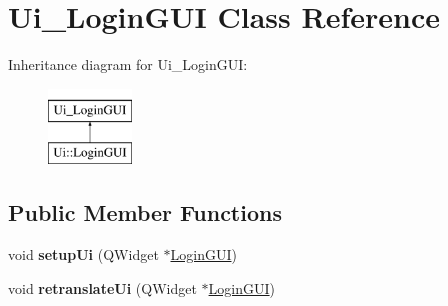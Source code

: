 \hypertarget{classUi__LoginGUI}{}\section{Ui\+\_\+\+Login\+G\+UI Class Reference}
\label{classUi__LoginGUI}
Inheritance diagram for Ui\+\_\+\+Login\+G\+UI\+:\begin{figure}[H]
\begin{center}
\leavevmode
\includegraphics[height=2.000000cm]{classUi__LoginGUI}
\end{center}
\end{figure}
\subsection*{Public Member Functions}
\begin{DoxyCompactItemize}
\item 
void {\bfseries setup\+Ui} (Q\+Widget $\ast$\hyperlink{classLoginGUI}{Login\+G\+UI})\hypertarget{classUi__LoginGUI_a4e1b1723ec2e53ba09af8437c7caa10a}{}\label{classUi__LoginGUI_a4e1b1723ec2e53ba09af8437c7caa10a}

\item 
void {\bfseries retranslate\+Ui} (Q\+Widget $\ast$\hyperlink{classLoginGUI}{Login\+G\+UI})\hypertarget{classUi__LoginGUI_a1ecee54e75379668a3a3bb05416262f2}{}\label{classUi__LoginGUI_a1ecee54e75379668a3a3bb05416262f2}

\end{DoxyCompactItemize}
